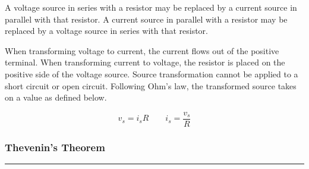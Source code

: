 \documentclass{article}
\begin{document}
    A voltage source in series with a resistor may be replaced by a current source in parallel with that resistor.
    A current source in parallel with a resistor may be replaced by a voltage source in series with that resistor.

    When transforming voltage to current, the current flows out of the positive terminal.
    When transforming current to voltage, the resistor is placed on the positive side of the voltage source.
    Source transformation cannot be applied to a short circuit or open circuit.
    Following Ohm's law, the transformed source takes on a value as defined below.

    \[
        v_s = i_s R     \qquad   i_s = \frac{v_s}{R}
    \]

    \smallskip
    \subsubsection*{Thevenin's Theorem}
    \vspace{-1em}
    \rule{\linewidth}{0.1mm}
\end{document}
